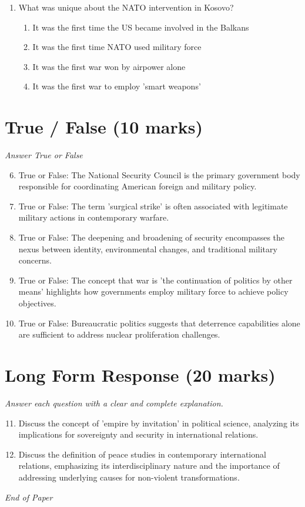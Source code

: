 \documentclass[12pt]{article}
\begin{document}
\begin{enumerate}[label=\arabic*.]
\begin{enumerate}[label=(\alph*)]
    \item British preoccupation with Europe
    \item All of the above
\end{enumerate}
\item What was unique about the NATO intervention in Kosovo?
\begin{enumerate}[label=(\alph*)]
    \item It was the first time the US became involved in the Balkans
    \item It was the first time NATO used military force
    \item It was the first war won by airpower alone
    \item It was the first war to employ 'smart weapons'
\end{enumerate}
\end{enumerate}

\section*{True / False (10 marks)}
\textit{Answer True or False}
\begin{enumerate}[label=\arabic*.]
\setcounter{enumi}{5}
\item True or False: The National Security Council is the primary government body responsible for coordinating American foreign and military policy.
\item True or False: The term 'surgical strike' is often associated with legitimate military actions in contemporary warfare.
\item True or False: The deepening and broadening of security encompasses the nexus between identity, environmental changes, and traditional military concerns.
\item True or False: The concept that war is 'the continuation of politics by other means' highlights how governments employ military force to achieve policy objectives.
\item True or False: Bureaucratic politics suggests that deterrence capabilities alone are sufficient to address nuclear proliferation challenges.
\end{enumerate}

\section*{Long Form Response (20 marks)}
\textit{Answer each question with a clear and complete explanation.}
\begin{enumerate}[label=\arabic*.]
\setcounter{enumi}{10}
\item Discuss the concept of 'empire by invitation' in political science, analyzing its implications for sovereignty and security in international relations.
\item Discuss the definition of peace studies in contemporary international relations, emphasizing its interdisciplinary nature and the importance of addressing underlying causes for non-violent transformations.
\end{enumerate}

\vfill
\noindent\textit{End of Paper}
\end{document}
